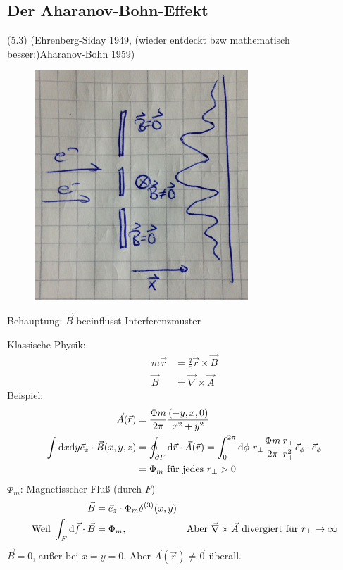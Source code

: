 \subsection{Der Aharanov-Bohn-Effekt} (5.3)
(Ehrenberg-Siday 1949, (wieder entdeckt bzw mathematisch besser:)Aharanov-Bohn 1959)
	\begin{figure} [h]
	\begin{center}
		\includegraphics[width=8cm]{Aharanov-Bohn-Effekt1}
	\end{center}
	\end{figure}
Behauptung: $\vec{B}$ beeinflusst Interferenzmuster

Klassische Physik:
	\begin{align*}
		m \ddot{\vec{r}} &= \frac{q}{c} \dot{\vec{r}} \times \vec{B} \\
		\vec{B} &= \vec{\nabla} \times \vec{A}
	\end{align*}
Beispiel:
	\begin{align*}
		\vec{A}(\vec{r}) &= \frac{\Phi m}{2\pi} \frac{(-y,x,0)}{x^2 + y^2} \\
		\int \mathrm{d} x \mathrm{d} y \vec{e}_z \cdot \vec{B}(x,y,z) &=
		\oint_{\partial F} \mathrm{d} \vec{r} \cdot \vec{A}(\vec{r})=
		\int_{0}^{2 \pi} \mathrm{d} \phi ~r_{\perp} \frac{\Phi m}{2 \pi} \frac{r_{\perp}}{r_{\perp}^2} \vec{e}_\phi \cdot \vec{e}_\phi \\
		&=\Phi_m ~\text{für jedes } r_{\perp} > 0
	\end{align*}
$\Phi_m$: Magnetisscher Fluß (durch $F$)
	\begin{align*}
		\vec{B} &= \vec{e}_z \cdot \Phi_m \delta^{(3)}(x,y) \\
		\text{Weil } \int_F \mathrm{d} \vec{f} \cdot \vec{B} &= \Phi_m,&
		\text{Aber } \vec{\nabla} \times \vec{A} \text{ divergiert für } r_{\perp} \rightarrow \infty
	\end{align*}
$\vec{B} = 0$, außer bei $x=y=0$. Aber $\vec{A}(\vec{r}) \neq \vec{0}$ überall.

